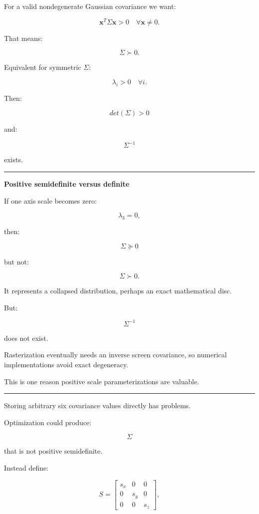 For a valid nondegenerate Gaussian covariance we want:

\[
\boxed{
\mathbf x^T
\Sigma
\mathbf x
>
0
\quad
\forall\mathbf x\ne0.
}
\]

That means:

\[
\Sigma\succ0.
\]

Equivalent for symmetric \(\Sigma\):

\[
\lambda_i>0
\quad
\forall i.
\]

Then:

\[
det(\Sigma)>0
\]

and:

\[
\Sigma^{-1}
\]

exists.

\begin{center}\rule{0.5\linewidth}{0.5pt}\end{center}

\textbf{Positive semidefinite versus definite}

If one axis scale becomes zero:

\[
\lambda_3=0,
\]

then:

\[
\Sigma\succeq0
\]

but not:

\[
\Sigma\succ0.
\]

It represents a collapsed distribution, perhaps an exact mathematical disc.

But:

\[
\Sigma^{-1}
\]

does not exist.

Rasterization eventually needs an inverse screen covariance, so numerical implementations avoid exact degeneracy.

This is one reason positive scale parameterizations are valuable.

\begin{center}\rule{0.5\linewidth}{0.5pt}\end{center}

Storing arbitrary six covariance values directly has problems.

Optimization could produce:

\[
\Sigma
\]

that is not positive semidefinite.

Instead define:

\[
S=
\begin{bmatrix}
s_x&0&0\\
0&s_y&0\\
0&0&s_z
\end{bmatrix},
\]


